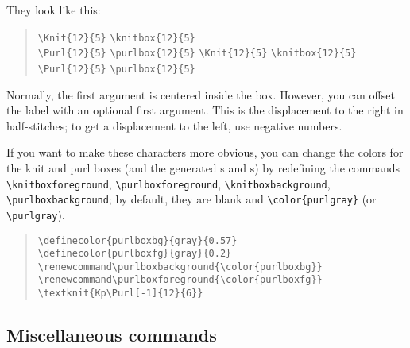 \documentclass[draft]{amsart}
\begin{document}
\begin{itemize}
They look like this: 
\begin{quote}\raggedright 
\knitgrid
\verb|\Knit{12}{5}| 
\verb|\knitbox{12}{5}| \\
\verb|\Purl{12}{5}| 
\verb|\purlbox{12}{5}| 
\knitnogrid
\verb|\Knit{12}{5}| 
\verb|\knitbox{12}{5}| \\
\verb|\Purl{12}{5}| 
\verb|\purlbox{12}{5}| 
\end{quote}

Normally, the first argument is centered inside the box. However, you can offset the label with an optional first argument. This is the displacement to the right in half-stitches; to get a displacement to the left, use negative numbers.

If you want to make these characters more obvious, you can change the colors for the knit and purl boxes (and the generated {\knitnogrid \textknit{=}s and \textknit{-}s}) by redefining the commands \verb|\knitboxforeground|, \verb|\purlboxforeground|, \verb|\knitboxbackground|, \verb|\purlboxbackground|; by default, they are blank and \verb|\color{purlgray}| (or \verb|\purlgray|).

\begin{quote}\raggedright 
\knitnogrid
\verb?\definecolor{purlboxbg}{gray}{0.57}?\\
\verb?\definecolor{purlboxfg}{gray}{0.2}?\\
\verb?\renewcommand\purlboxbackground{\color{purlboxbg}}?\\
\verb?\renewcommand\purlboxforeground{\color{purlboxfg}}?\\
\verb?\textknit{Kp\Purl[-1]{12}{6}}?
\renewcommand\purlboxbackground{\color{purlboxbg}}
\renewcommand\purlboxforeground{\color{purlboxfg}}
\end{quote}

\end{itemize}

\subsection{Miscellaneous commands}
\end{document}
